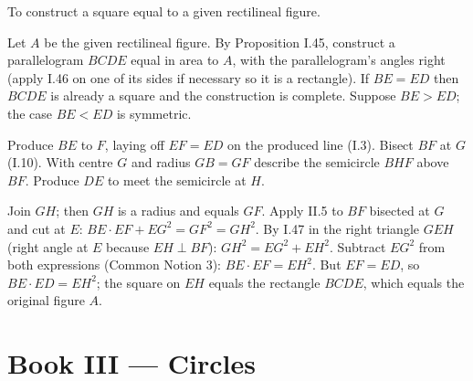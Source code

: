\documentclass{rrxiv}
\begin{document}
\begin{claim}
\label{prop:II.14}
To construct a square equal to a given rectilineal figure.
\end{claim}
\begin{evidence}[Proof of II.14]
\label{ev:II.14}

Let $A$ be the given rectilineal figure.  By Proposition I.45,
construct a parallelogram $BCDE$ equal in area to $A$, with the
parallelogram's angles right (apply I.46 on one of its sides if
necessary so it is a rectangle).  If $BE = ED$ then $BCDE$ is
already a square and the construction is complete.  Suppose
$BE > ED$; the case $BE < ED$ is symmetric.

Produce $BE$ to $F$, laying off $EF = ED$ on the produced line
(I.3).  Bisect $BF$ at $G$ (I.10).  With centre $G$ and radius
$GB = GF$ describe the semicircle $BHF$ above $BF$.  Produce $DE$
to meet the semicircle at $H$.

Join $GH$; then $GH$ is a radius and equals $GF$.  Apply II.5 to
$BF$ bisected at $G$ and cut at $E$: $BE \cdot EF + EG^2 = GF^2 =
GH^2$.  By I.47 in the right triangle $GEH$ (right angle at $E$
because $EH \perp BF$): $GH^2 = EG^2 + EH^2$.  Subtract $EG^2$
from both expressions (Common Notion 3): $BE \cdot EF = EH^2$.
But $EF = ED$, so $BE \cdot ED = EH^2$; the square on $EH$ equals
the rectangle $BCDE$, which equals the original figure $A$.
\end{evidence}
%
%

\section{Book III --- Circles}
\label{sec:book-III}
\end{document}
